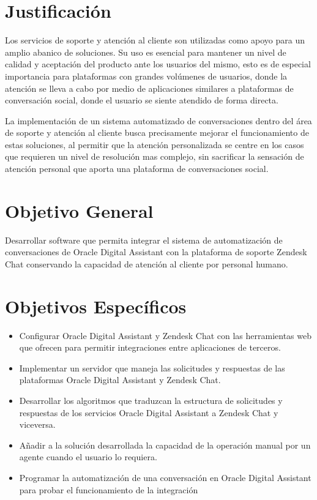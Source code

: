 \section{Justificación}
Los servicios de soporte y atención al cliente son utilizadas como apoyo para un amplio abanico de soluciones. Su uso es esencial para mantener un nivel de calidad y aceptación del producto ante los usuarios del mismo, esto es de especial importancia para plataformas con grandes volúmenes de usuarios, donde la atención se lleva a cabo por medio de aplicaciones similares a plataformas de conversación social, donde el usuario se siente atendido de forma directa. 

La implementación de un sistema automatizado de conversaciones dentro del área de soporte y atención al cliente busca precisamente mejorar el funcionamiento de estas soluciones, al permitir que la atención personalizada se centre en los casos que requieren un nivel de resolución mas complejo, sin sacrificar la sensación de atención personal que aporta una plataforma de conversaciones social.


\section{Objetivo General}

Desarrollar software que permita integrar el sistema de automatización de conversaciones de Oracle Digital Assistant con la plataforma de soporte Zendesk Chat conservando la capacidad de atención al cliente por personal humano.

    
\section{Objetivos Específicos}
    \begin{itemize}
        \item Configurar Oracle Digital Assistant y Zendesk Chat con las herramientas web que ofrecen para permitir integraciones entre aplicaciones de terceros.
        
        \item Implementar un servidor que maneja las solicitudes y respuestas de las plataformas Oracle Digital Assistant y Zendesk Chat.
        
       	\item Desarrollar los algoritmos que traduzcan la estructura de solicitudes y respuestas de los servicios Oracle Digital Assistant a Zendesk Chat y viceversa.
    
    	\item Añadir a la solución desarrollada la capacidad de la operación manual por un agente cuando el usuario lo requiera.
                
        \item Programar la automatización de una conversación en Oracle Digital Assistant para probar el funcionamiento de la integración
        
    \end{itemize}
    
